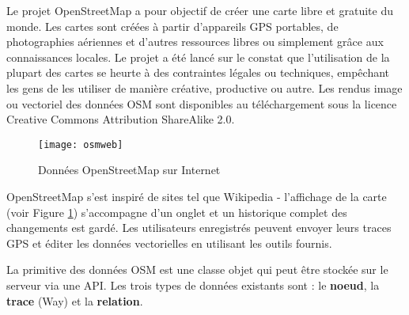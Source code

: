 
Le projet OpenStreetMap a pour objectif de créer une carte libre et gratuite du monde. Les cartes sont créées à partir d'appareils GPS portables, de photographies aériennes et d'autres ressources libres ou simplement grâce aux connaissances locales. Le projet a été lancé sur le constat que l'utilisation de la plupart des cartes se heurte à des contraintes légales ou techniques, empêchant les gens de les utiliser de manière créative, productive ou autre. Les rendus image ou vectoriel des données OSM sont disponibles au téléchargement sous la licence Creative Commons Attribution ShareAlike 2.0.

\begin{figure}[ht]
   \centering
   \texttt{[image: osmweb]}
   \caption{Données OpenStreetMap sur Internet \nixcaption}\label{fig:osmweb}
\end{figure}

OpenStreetMap s'est inspiré de sites tel que Wikipedia - l'affichage de la carte (voir Figure \ref{fig:osmweb}) s'accompagne d'un onglet  et un historique complet des changements est gardé. Les utilisateurs enregistrés peuvent envoyer leurs traces GPS et éditer les données vectorielles en utilisant les outils fournis.

La primitive des données OSM est une classe objet qui peut être stockée sur le serveur via une API. Les trois types de données existants sont : le \textbf{noeud}, la \textbf{trace} (Way) et la \textbf{relation}.

